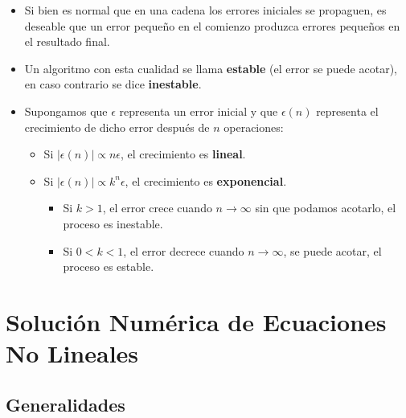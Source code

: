 \documentclass[]{book}
\providecommand{\tightlist}{%
  \setlength{\itemsep}{0pt}\setlength{\parskip}{0pt}}
\begin{document}
\begin{itemize}
\item
  Si bien es normal que en una cadena los errores iniciales se propaguen, es deseable que un error pequeño en el comienzo produzca errores pequeños en el resultado final.
\item
  Un algoritmo con esta cualidad se llama \textbf{estable} (el error se puede acotar), en caso contrario se dice \textbf{inestable}.
\item
  Supongamos que \(\epsilon\) representa un error inicial y que \(\epsilon (n)\) representa el crecimiento de dicho error después de \(n\) operaciones:

  \begin{itemize}
  \tightlist
  \item
    Si \(|\epsilon (n)| \propto n \epsilon\), el crecimiento es \textbf{lineal}.
  \item
    Si \(|\epsilon (n)| \propto k^n \epsilon\), el crecimiento es \textbf{exponencial}.

    \begin{itemize}
    \tightlist
    \item
      Si \(k > 1\), el error crece cuando \(n \rightarrow \infty\) sin que podamos acotarlo, el proceso es inestable.
    \item
      Si \(0 < k < 1\), el error decrece cuando \(n \rightarrow \infty\), se puede acotar, el proceso es estable.
    \end{itemize}
  \end{itemize}
\end{itemize}

\hypertarget{soluciuxf3n-numuxe9rica-de-ecuaciones-no-lineales}{%
\chapter{Solución Numérica de Ecuaciones No Lineales}\label{soluciuxf3n-numuxe9rica-de-ecuaciones-no-lineales}}

\hypertarget{generalidades}{%
\section{Generalidades}\label{generalidades}}
\end{document}
